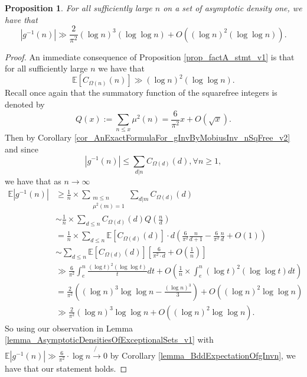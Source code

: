 \documentclass[11pt,reqno,a4letter]{article}
\numberwithin{figure}{section}
\numberwithin{table}{section}
\theoremstyle{plain}
\newtheorem{prop}[theorem]{Proposition}
\numberwithin{theorem}{section}
\theoremstyle{definition}
\begin{document}
\begin{prop} 
\label{prop_GInvGeqBehavior_v1} 
For all sufficiently large $n$ on a set of asymptotic density one, we have that 
\[
|g^{-1}(n)| \gg \frac{2}{\pi^2} (\log n)^3 (\log\log n) + O\left((\log n)^2 (\log\log n)\right). 
\]
\end{prop} 
\begin{proof} 
An immediate consequence of 
Proposition \ref{prop_factA_stmt_v1} 
is that for all sufficiently large $n$ we have that 
\[
\mathbb{E}\left[C_{\Omega(n)}(n)\right] \gg (\log n)^2 (\log\log n). 
\]
Recall once again that the summatory function of the squarefree integers is denoted by 
\[
Q(x) := \sum_{n \leq x} \mu^2(n) = \frac{6}{\pi^2} x + O(\sqrt{x}). 
\]
Then by Corollary \ref{cor_AnExactFormulaFor_gInvByMobiusInv_nSqFree_v2} 
and since 
\[
|g^{-1}(n)| \leq \sum_{d|n} C_{\Omega(d)}(d), \forall n \geq 1, 
\]
we have that as $n \rightarrow \infty$ 
\begin{align*} 
\mathbb{E}|g^{-1}(n)| & \geq \frac{1}{n} \times \sum_{\substack{m \leq n \\ \mu^2(m) = 1}} \sum_{d|m} C_{\Omega(d)}(d) \\ 
     & \sim \frac{1}{n} \times \sum_{d \leq n} C_{\Omega(d)}(d) Q\left(\frac{n}{d}\right) \\ 
     & = \frac{1}{n} \times \sum_{d \leq n} \mathbb{E}[C_{\Omega(d)}(d)] \cdot d \left( 
     \frac{6}{\pi^2} \frac{n}{d+1} - \frac{6}{\pi^2} \frac{n}{d} + O(1)\right) \\ 
     & \sim \sum_{d \leq n} \mathbb{E}[C_{\Omega(d)}(d)] \left[\frac{6}{\pi^2 \cdot d} + O\left(\frac{1}{n}\right)\right] \\ 
     & \gg \frac{6}{\pi^2} \int_{e}^n \frac{(\log t)^2 (\log\log t)}{t} dt + 
     O\left(\frac{1}{n} \times \int_{e}^n (\log t)^2 (\log\log t) dt\right) \\ 
     & = \frac{2}{\pi^2} \left((\log n)^3 \log\log n - \frac{(\log n)^3}{3}\right) + 
     O\left((\log n)^2 \log\log n\right) \\ 
     & \gg \frac{2}{\pi^2} (\log n)^3 \log\log n + O\left((\log n)^2 \log\log n\right). 
\end{align*} 
So using our observation in Lemma \ref{lemma_AsymptoticDensitiesOfExceptionalSets_v1} 
with $\mathbb{E}|g^{-1}(n)| \gg \frac{6}{\pi^2} \cdot \log n \not{\rightarrow} 0$ by 
Corollary \ref{lemma_BddExpectationOfgInvn}, we have that our statement holds. 
\end{proof} 
\end{document}
